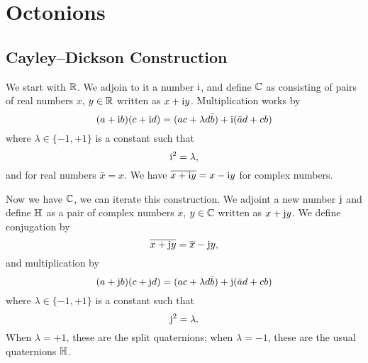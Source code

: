 \chapter{Octonions}

\section{Cayley--Dickson Construction}

We start with $\mathbb{R}$. We adjoin to it a number $\mathrm{i}$, and define $\mathbb{C}$ as
consisting of pairs of real numbers $x$, $y\in\mathbb{R}$ written as $x + \mathrm{i} y$.
Multiplication works by
\begin{equation}
(a + \mathrm{i} b)(c + \mathrm{i} d) = (ac + \lambda d\bar{b}) + \mathrm{i}(\bar{a}d + cb) 
\end{equation}
where $\lambda\in\{-1,+1\}$ is a constant such that
\begin{equation}
\mathrm{i}^{2} = \lambda,
\end{equation}
and for real numbers $\bar{x}=x$. We have $\overline{x + \mathrm{i} y} = x - \mathrm{i} y$
for complex numbers.

Now we have $\mathbb{C}$, we can iterate this construction. We adjoint a new
number $\mathrm{j} $ and define $\mathbb{H}$ as a pair of complex numbers $x$, $y\in\mathbb{C}$
written as $x + \mathrm{j} y$. We define conjugation by
\begin{equation}
\overline{x + \mathrm{j} y} = \overline{x} - \mathrm{j} y,
\end{equation}
and multiplication by
\begin{equation}
(a + \mathrm{j} b)(c + \mathrm{j} d) = (ac + \lambda d\bar{b}) + \mathrm{j}(\bar{a}d + cb) 
\end{equation}
where $\lambda\in\{-1,+1\}$ is a constant such that
\begin{equation}
\mathrm{j}^{2} = \lambda.
\end{equation}
When $\lambda=+1$, these are the split quaternions; when $\lambda=-1$,
these are the usual quaternions $\mathbb{H}$.


